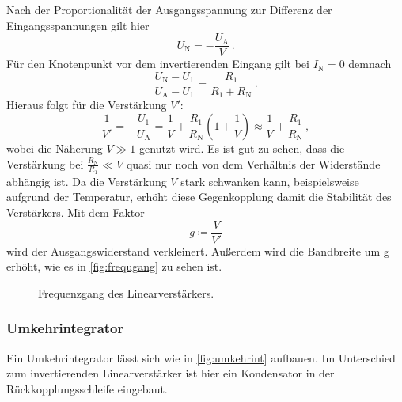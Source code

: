 
\noindent
Nach der Proportionalität der Ausgangsspannung zur Differenz der Eingangsspannungen gilt hier 
\begin{equation}
    U_\text{N} = - \frac{U_\text{A}}{V}\, .
\end{equation}
Für den Knotenpunkt vor dem invertierenden Eingang gilt bei $I_\text{N} = 0$ demnach 
\begin{equation*}
    \frac{U_\text{N} - U_1}{U_\text{A} - U_1} = \frac{R_1}{R_1 + R_\text{N}}\, .
\end{equation*}
Hieraus folgt für die Verstärkung $V'$: 
\begin{equation*}
    \frac{1}{V'} = - \frac{U_1}{U_\text{A}} = \frac{1}{V} + \frac{R_1}{R_\text{N}}\left(1 + \frac{1}{V}\right) \approx \frac{1}{V} + \frac{R_1}{R_\text{N}}\, ,
\end{equation*}
wobei die Näherung $V\gg 1$ genutzt wird. Es ist gut zu sehen, dass die Verstärkung bei $\frac{R_\text{N}}{R_1} \ll V$ quasi nur noch von dem Verhältnis der Widerstände abhängig ist. Da die Verstärkung $V$ stark schwanken kann, beispielsweise aufgrund der Temperatur, erhöht diese Gegenkopplung damit die Stabilität des Verstärkers. Mit dem Faktor 
\begin{equation*}
    g \coloneq \frac{V}{V'}
\end{equation*}
wird der Ausgangswiderstand verkleinert. Außerdem wird die Bandbreite um g erhöht, wie es in \autoref{fig:frequgang} zu sehen ist.
 
        


\begin{figure}[H]
    \centering
    \caption{Frequenzgang des Linearverstärkers. \cite{V51_old}}
    \label{fig:frequgang}
\end{figure}

\subsubsection{Umkehrintegrator}

\noindent
Ein Umkehrintegrator lässt sich wie in \autoref{fig:umkehrint} aufbauen. Im Unterschied zum invertierenden Linearverstärker ist hier ein Kondensator in der Rückkopplungsschleife eingebaut.

